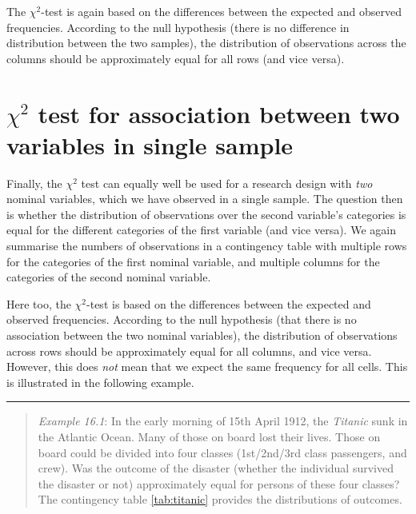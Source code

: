 \documentclass[
]{book}
\begin{document}
The \(\chi^2\)-test is again based on the differences between the expected and
observed frequencies. According to the null hypothesis (there is no difference
in distribution between the two samples), the distribution of observations
across the columns should be approximately equal for all rows
(and vice versa).

\hypertarget{chi2-test-for-association-between-two-variables-in-single-sample}{%
\section{\texorpdfstring{\(\chi^2\) test for association between two variables in single sample}{\textbackslash chi\^{}2 test for association between two variables in single sample}}\label{chi2-test-for-association-between-two-variables-in-single-sample}}

Finally, the \(\chi^2\) test can equally well be used for a research design
with \emph{two} nominal variables, which we have observed in a single
sample. The question then is whether the distribution of observations
over the second variable's categories is equal for the different
categories of the first variable (and vice versa). We again summarise
the numbers of observations in a contingency table with multiple rows for
the categories of the first nominal variable, and multiple columns
for the categories of the second nominal variable.

Here too, the \(\chi^2\)-test is based on the differences between the expected and
observed frequencies. According to the null hypothesis (that there is no association
between the two nominal variables), the distribution of observations across
rows should be approximately equal for all columns, and vice versa. However, this
does \emph{not} mean that we expect the same frequency for all cells.
This is illustrated in the following example.

\begin{center}\rule{0.5\linewidth}{0.5pt}\end{center}

\begin{quote}
\emph{Example 16.1}: In the early morning of 15th April 1912, the \emph{Titanic}
sunk in the Atlantic Ocean. Many of those on board lost their lives.
Those on board could be divided into four classes (1st/2nd/3rd class passengers, and crew). Was the outcome of the disaster (whether the individual survived the
disaster or not) approximately equal for persons of these four classes?
The contingency table \ref{tab:titanic} provides the distributions of
outcomes.
\end{quote}
\end{document}
